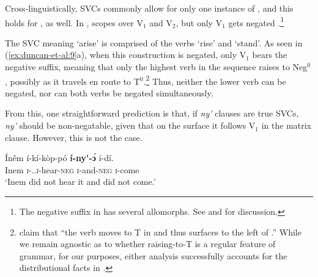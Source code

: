 \documentclass[output=paper,modfonts,nonflat,
colorlinks, citecolor=brown,
draftmode
]{langsci/langscibook}
\begin{document}
Cross-linguistically, SVCs commonly allow for only one instance of  \citep{hiraiwa2008object}, and this holds for , as well. In ,  scopes over V$_1$ and V$_2$, but only V$_1$ gets negated \citep{major2015serial}.\footnote{The negative suffix in  has several allomorphs. See \citet[124-127]{akinlabi2003} and \citet[89]{duncan2016parallel} for discussion.}

\ea\label{ex:duncan-et-al:9}
\z
\z

\noindent The SVC meaning `arise' is comprised of the verbs `rise' and `stand'. As seen in (\ref{ex:duncan-et-al:9}a), when this construction is negated, only V$_1$ bears the negative suffix, meaning that only the highest verb in the sequence raises to Neg$^0$ \citep{duncan-toappear}, possibly as it travels en route to T$^0$.\footnote{\citet[120]{baker2010agreement} claim that ``the verb moves to T in  and thus surfaces to the left of .'' While we remain agnostic as to whether raising-to-T is a regular feature of  grammar, for our purposes, either analysis successfully accounts for the distributional facts in .} Thus, neither the lower verb can be negated, nor can both verbs be negated simultaneously. 

From this, one straightforward prediction is that, if \textit{ny\'{\textturnv}\ng} clauses are true SVCs, \textit{ny\'{\textturnv}\ng} should be non-negatable, given that on the surface it follows V$_1$ in the matrix clause. However, this is not the case.

\ea\label{ex:duncan-et-al:10}
\gll \'{I}nêm í-kí-k\`{o}p-pó \textbf{í-ny\'{\textturnv}\ng-\ng \'ɔ} í-dí. \\
Inem \textsc{i}-{\PST.\FOC}.\textsc{i}-hear-\textsc{neg} \textsc{i}-and-\textsc{neg} \textsc{i}-come \\
\glt ‘Inem did not hear it and did not come.’ \citep[86]{essien1985negation}
\z
\end{document}
